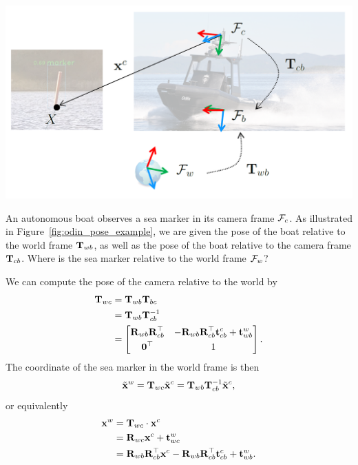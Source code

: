 \begin{example}[frametitle=Seeing a point in the world with a camera]
{
  \centering
  \includegraphics[width=0.75\columnwidth]{figures/odin_pose_example.png}
  \captionsetup{type=figure}
  \label{fig:odin_pose_example}
  \par
}

An autonomous boat observes a sea marker in its camera frame $\mathcal{F}_c$.
As illustrated in Figure~\ref{fig:odin_pose_example}, we are given the pose of the boat relative to the world frame ${\boldsymbol{\mathbf{T}}}_{wb}$, as well as the pose of the boat relative to the camera frame ${\boldsymbol{\mathbf{T}}}_{cb}$.
Where is the sea marker relative to the world frame $\mathcal{F}_w$?

We can compute the pose of the camera relative to the world by
\begin{subequations}
\begin{align}
  {\boldsymbol{\mathbf{T}}}_{wc} &= {\boldsymbol{\mathbf{T}}}_{wb} {\boldsymbol{\mathbf{T}}}_{bc}\\
  &= {\boldsymbol{\mathbf{T}}}_{wb} {\boldsymbol{\mathbf{T}}}_{cb}^{-1}\\
  &=
  \begin{bmatrix}
    {\boldsymbol{\mathbf{R}}}_{wb} {\boldsymbol{\mathbf{R}}}_{cb}^{\top}  & -{\boldsymbol{\mathbf{R}}}_{wb} {\boldsymbol{\mathbf{R}}}_{cb}^{\top} {\boldsymbol{\mathbf{t}}}^c_{cb} + {\boldsymbol{\mathbf{t}}}^w_{wb}\\[0.3em]
    \boldsymbol{\mathbf{0}}^{\top} & 1
  \end{bmatrix}.
\end{align}
\end{subequations}
The coordinate of the sea marker in the world frame is then
\begin{equation}
  \tilde{{\boldsymbol{\mathbf{x}}}}^w = {\boldsymbol{\mathbf{T}}}_{wc} \tilde{{\boldsymbol{\mathbf{x}}}}^c = {\boldsymbol{\mathbf{T}}}_{wb} {\boldsymbol{\mathbf{T}}}_{cb}^{-1} \tilde{{\boldsymbol{\mathbf{x}}}}^c,
\end{equation}
or equivalently
\begin{subequations}
\begin{align}
  {\boldsymbol{\mathbf{x}}}^w &= {\boldsymbol{\mathbf{T}}}_{wc} \cdot {\boldsymbol{\mathbf{x}}}^c\\
  &= {\boldsymbol{\mathbf{R}}}_{wc} {\boldsymbol{\mathbf{x}}}^c + {\boldsymbol{\mathbf{t}}}^w_{wc}\\
  &= {\boldsymbol{\mathbf{R}}}_{wb} {\boldsymbol{\mathbf{R}}}_{cb}^{\top} {\boldsymbol{\mathbf{x}}}^c - {\boldsymbol{\mathbf{R}}}_{wb} {\boldsymbol{\mathbf{R}}}_{cb}^{\top} {\boldsymbol{\mathbf{t}}}^c_{cb} + {\boldsymbol{\mathbf{t}}}^w_{wb}.
\end{align}
\end{subequations}
\end{example}
